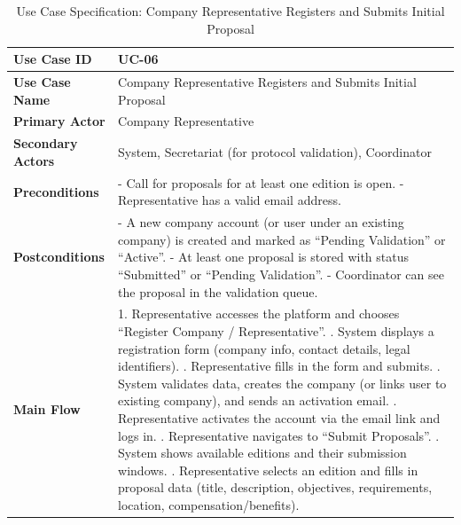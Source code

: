 \newpage
\renewcommand{\arraystretch}{1.5} 
\begin{xltabular}{\textwidth}{|l|X|}
    \caption{Use Case Specification: Company Representative Registers and Submits Initial Proposal} \label{tab:UC-06} \\
    
    \hline
    \textbf{Use Case ID} & UC-06 \\ \hline
    \textbf{Use Case Name} & Company Representative Registers and Submits Initial Proposal \\ \hline
    \textbf{Primary Actor} & Company Representative \\ \hline
    \textbf{Secondary Actors} & System, Secretariat (for protocol validation), Coordinator \\ \hline
    \textbf{Preconditions} &
        - Call for proposals for at least one edition is open. \newline
        - Representative has a valid email address.
        \\ \hline
    \textbf{Postconditions} &
        - A new company account (or user under an existing company) is created and marked as “Pending Validation” or “Active”. \newline
        - At least one proposal is stored with status “Submitted” or “Pending Validation”. \newline
        - Coordinator can see the proposal in the validation queue.
        \\ \hline
    \textbf{Main Flow} &
        1. Representative accesses the platform and chooses “Register Company / Representative”. . System displays a registration form (company info, contact details, legal identifiers). . Representative fills in the form and submits. . System validates data, creates the company (or links user to existing company), and sends an activation email. . Representative activates the account via the email link and logs in. . Representative navigates to “Submit Proposals”. . System shows available editions and their submission windows. . Representative selects an edition and fills in proposal data (title, description, objectives, requirements, location, compensation/benefits). \newline

\end{xltabular}
